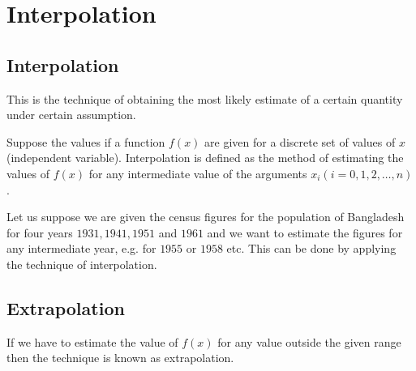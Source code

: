 \documentclass[12pt,class=book,crop=false]{standalone}
\begin{document}
\chapter{Interpolation}
\section{Interpolation}
This is the technique of obtaining the most likely estimate of a certain quantity under certain assumption.

Suppose the values if a function \(  f(x) \) are given for a discrete set of values of \(  x \) (independent variable). Interpolation is defined as the method of estimating the values of \(  f(x) \) for any intermediate value of the arguments \(  x_i (i=0,1,2,\dots ,n) \).

Let us suppose we are given the census figures for the population of Bangladesh for four years \(  1931, 1941, 1951 \) and \(  1961 \) and we want to estimate the figures for any intermediate year, e.g. for \(  1955 \) or \(  1958 \) etc. This can be done by applying the technique of interpolation.
\section{Extrapolation}
If we have to estimate the value of \(  f(x) \) for any value outside the given range then the technique is known as extrapolation.
\end{document}
